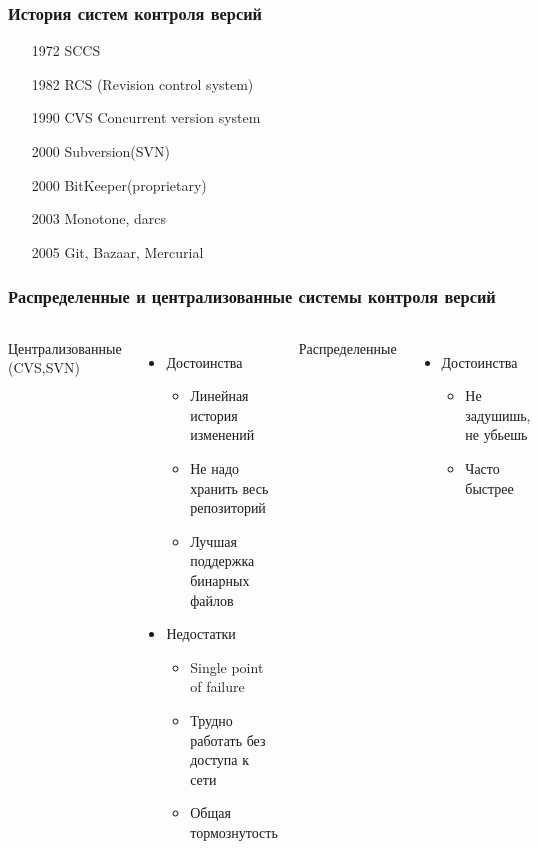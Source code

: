 \begin{frame}
 \frametitle{История систем контроля версий}
 \begin{enumerate}
  \item[1972] SCCS
  \item[1982] RCS (Revision control system)
  \item[1990] CVS Concurrent version system
  \item[2000] Subversion(SVN)
  \item[2000] BitKeeper(proprietary)
  \item[2003] Monotone, darcs
  \item[2005] Git, Bazaar, Mercurial
 \end{enumerate}
\end{frame}

\begin{frame}
 \frametitle{Распределенные и централизованные системы контроля версий}
 \begin{columns}
   \begin{center}
     Централизованные (CVS,SVN)
   \end{center}
   \begin{itemize}
    \item Достоинства
     \begin{itemize}
       \item Линейная история изменений
       \item Не надо хранить весь репозиторий
       \item Лучшая поддержка бинарных файлов
     \end{itemize}
    \item Недостатки
     \begin{itemize}
       \item Single point of failure
       \item Трудно работать без доступа к сети
       \item Общая тормознутость
     \end{itemize}
   \end{itemize}
   \begin{center}
     Распределенные
   \end{center}
   \begin{itemize}
    \item Достоинства
     \begin{itemize}
       \item Не задушишь, не убьешь
       \item Часто быстрее

\end{itemize}
\end{itemize}
\end{columns}
\end{frame}
